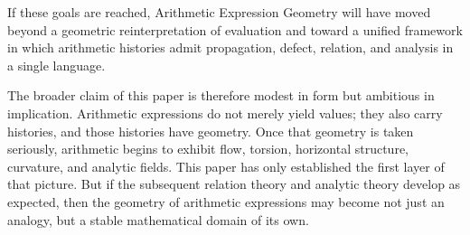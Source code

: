 If these goals are reached, Arithmetic Expression Geometry will have moved beyond a geometric reinterpretation of evaluation and toward a unified framework in which arithmetic histories admit propagation, defect, relation, and analysis in a single language.

\medskip

The broader claim of this paper is therefore modest in form but ambitious in implication. Arithmetic expressions do not merely yield values; they also carry histories, and those histories have geometry. Once that geometry is taken seriously, arithmetic begins to exhibit flow, torsion, horizontal structure, curvature, and analytic fields. This paper has only established the first layer of that picture. But if the subsequent relation theory and analytic theory develop as expected, then the geometry of arithmetic expressions may become not just an analogy, but a stable mathematical domain of its own.
